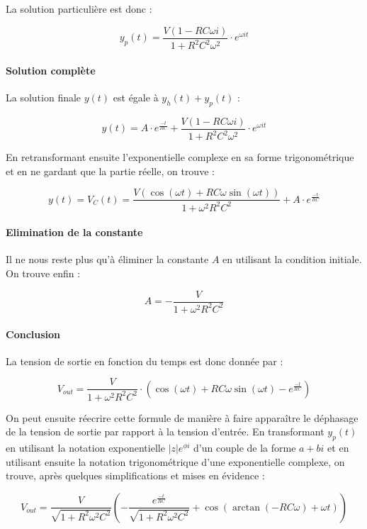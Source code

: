 La solution particulière est donc :

$$y_p(t) = \frac{V(1-RC\omega i)}{1+R^2C^2\omega^2} \cdot e^{\omega i t}$$

\paragraph{Solution complète}

La solution finale $y(t)$ est égale à $y_h(t) + y_p(t)$ :

$$y(t) = A \cdot e^{\frac{-t}{RC}} + \frac{V(1-RC\omega i)}{1+R^2C^2\omega^2} \cdot e^{\omega i t}$$

En retransformant ensuite l'exponentielle complexe en sa forme trigonométrique et en ne
gardant que la partie réelle, on trouve :

$$y(t) = V_C(t) = \frac{V(\cos (\omega t) + RC\omega \sin (\omega t))}{1 + \omega^2R^2C^2} + A \cdot e^{\frac{-t}{RC}}$$

\paragraph{Elimination de la constante}

Il ne nous reste plus qu'à éliminer la constante $A$ en utilisant la condition initiale.
On trouve enfin :

$$A = -\frac{V}{1 + \omega^2R^2C^2}$$                         

\paragraph{Conclusion}

La tension de sortie en fonction du temps est donc donnée par :

$$V_{out} = \frac{V}{1 + \omega^2R^2C^2} \cdot (\cos (\omega t) + RC\omega \sin (\omega t) - e^{\frac{-t}{RC}})$$

On peut ensuite réecrire cette formule de manière à faire apparaître
le déphasage de la tension de sortie par rapport à la tension d'entrée. En transformant
$y_p(t)$ en utilisant la notation exponentielle $|z|e^{\phi i}$ d'un couple de la forme 
$a+bi$ et en utilisant ensuite la notation trigonométrique d'une exponentielle complexe,
on trouve, après quelques simplifications et mises en évidence :

$$V_{out} = \frac{V}{\sqrt{1 + R^2\omega^2C^2}}
(-\frac{e^{\frac{-t}{RC}}}{\sqrt{1 + R^2\omega^2C^2}} + \cos(\arctan(-RC\omega) + \omega t))$$

